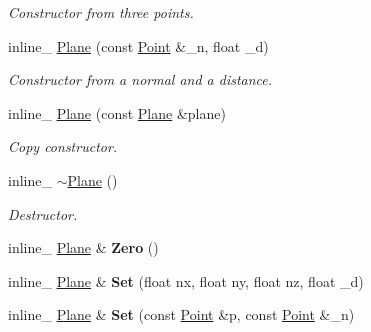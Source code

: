 \begin{DoxyCompactItemize}
\begin{DoxyCompactList}\small\item\em Constructor from three points. \end{DoxyCompactList}\item 
\hypertarget{class_plane_a9fee52646102f41f9067b422ce6cec21}{inline\+\_\+ \hyperlink{class_plane_a9fee52646102f41f9067b422ce6cec21}{Plane} (const \hyperlink{class_point}{Point} \&\+\_\+n, float \+\_\+d)}\label{class_plane_a9fee52646102f41f9067b422ce6cec21}

\begin{DoxyCompactList}\small\item\em Constructor from a normal and a distance. \end{DoxyCompactList}\item 
\hypertarget{class_plane_a58f64da1c7e9b12d93e6a4e75d3be901}{inline\+\_\+ \hyperlink{class_plane_a58f64da1c7e9b12d93e6a4e75d3be901}{Plane} (const \hyperlink{class_plane}{Plane} \&plane)}\label{class_plane_a58f64da1c7e9b12d93e6a4e75d3be901}

\begin{DoxyCompactList}\small\item\em Copy constructor. \end{DoxyCompactList}\item 
\hypertarget{class_plane_a380cb359aa32967b8e678b9f0610ec88}{inline\+\_\+ \hyperlink{class_plane_a380cb359aa32967b8e678b9f0610ec88}{$\sim$\+Plane} ()}\label{class_plane_a380cb359aa32967b8e678b9f0610ec88}

\begin{DoxyCompactList}\small\item\em Destructor. \end{DoxyCompactList}\item 
\hypertarget{class_plane_aed029c8093a95e0f9e982bc7759b4ba6}{inline\+\_\+ \hyperlink{class_plane}{Plane} \& {\bfseries Zero} ()}\label{class_plane_aed029c8093a95e0f9e982bc7759b4ba6}

\item 
\hypertarget{class_plane_ae96be08f62e6814f2c48791e6ad3cf30}{inline\+\_\+ \hyperlink{class_plane}{Plane} \& {\bfseries Set} (float nx, float ny, float nz, float \+\_\+d)}\label{class_plane_ae96be08f62e6814f2c48791e6ad3cf30}

\item 
\hypertarget{class_plane_a075dc73d74d819f323bcc14bab370204}{inline\+\_\+ \hyperlink{class_plane}{Plane} \& {\bfseries Set} (const \hyperlink{class_point}{Point} \&p, const \hyperlink{class_point}{Point} \&\+\_\+n)}\label{class_plane_a075dc73d74d819f323bcc14bab370204}


\end{DoxyCompactItemize}
